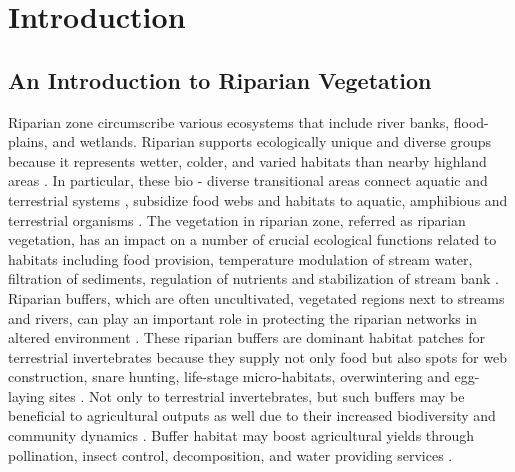 \documentclass[12pt,a4wide]{report}
\numberwithin{equation}{chapter}
\numberwithin{theorem}{chapter}
\begin{document}
%


\chapter{Introduction}

\label{Chapter1}
\vspace{-1.5cm}
\section{An Introduction to Riparian Vegetation}
\label{Zero_background}
Riparian zone circumscribe various ecosystems that include river banks, flood-plains, and wetlands. Riparian supports ecologically unique and diverse groups because it represents wetter, colder, and varied habitats than nearby highland areas \cite{pettit2007fire}. In particular, these bio - diverse transitional areas connect aquatic and terrestrial systems \cite{popescu2021riparian}, subsidize food webs and habitats to aquatic, amphibious and terrestrial organisms \cite{capron2020}. The vegetation in riparian zone, referred as riparian vegetation, has an impact on a number of crucial ecological functions related to habitats including food provision, temperature modulation of stream water, filtration of sediments, regulation of nutrients and stabilization of stream bank \citep{hood2000, richardson2007}.\\
Riparian buffers, which are often uncultivated, vegetated regions next to streams and rivers, can play an important role in protecting the riparian networks in altered environment \cite{burdon2020assessing}. These riparian buffers are dominant habitat patches for terrestrial invertebrates because they supply not only food but also spots for web construction, snare hunting, life-stage micro-habitats, overwintering and egg-laying sites \cite{popescu2021riparian}. Not only to terrestrial invertebrates, but such buffers may be beneficial to agricultural outputs as well due to their increased biodiversity and community dynamics \cite{forio2020small}. Buffer habitat may boost agricultural yields through pollination, insect control, decomposition, and water providing services \cite{luke2019}.
\end{document}
